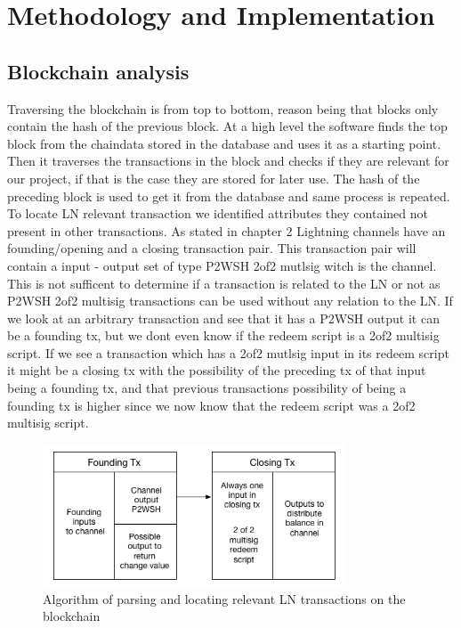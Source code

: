 \chapter{Methodology and Implementation}
\label{chap:metodology}

\section{Blockchain analysis}

Traversing the blockchain is from top to bottom, reason being that blocks only contain the hash of the previous block. 
At a high level the software finds the top block from the chaindata stored in the database and uses it as a starting point.
Then it traverses the transactions in the block and checks if they are relevant for our project, if that is the case they are stored for later use. The hash of the preceding block is used to get it from the database and same process is repeated.
To locate LN relevant transaction we identified attributes they contained not present in other transactions. As stated in chapter 2  Lightning channels have an founding/opening and a closing transaction pair. This transaction pair will contain a input - output set of type P2WSH 2of2 mutlsig witch is the channel. This is not sufficent to determine if a transaction is related to the LN or not as P2WSH 2of2 multisig transactions can be used without any relation to the LN. If we look at an arbitrary transaction and see that it has a P2WSH output it can be a founding tx, but we dont even know if the redeem script is a 2of2 multisig script. If we see a transaction which has a 2of2 mutlsig input in its redeem script it might be a closing tx with the possibility of the preceding tx of that input being a founding tx, and that previous transactions possibility of being a founding tx is higher since we now know that the redeem script was a 2of2 multisig script.


\begin{figure}[h]
    \centering
    \includegraphics[width=9cm]{figures/lnchain.png}
    \caption{Algorithm of parsing and locating relevant LN transactions on the blockchain}
    \label{fig:htlc_bc}
\end{figure}

